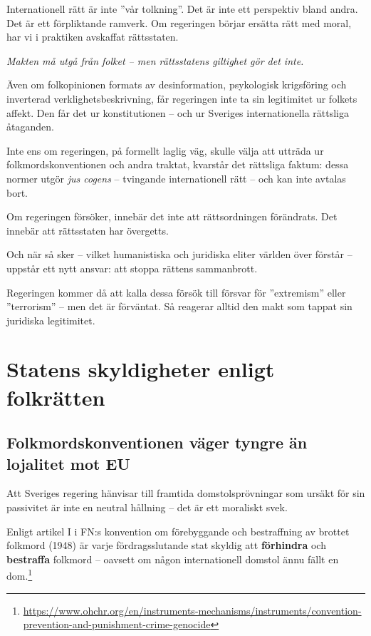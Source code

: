 \documentclass[12pt]{article}
\begin{document}
Internationell rätt är inte ”vår tolkning”. Det är inte ett perspektiv bland andra. Det är ett förpliktande ramverk. Om regeringen börjar ersätta rätt med moral, har vi i praktiken avskaffat rättsstaten.

\vspace{1em}
\textit{Makten må utgå från folket – men rättsstatens giltighet gör det inte.}

Även om folkopinionen formats av desinformation, psykologisk krigsföring och inverterad verklighetsbeskrivning, får regeringen inte ta sin legitimitet ur folkets affekt. Den får det ur konstitutionen – och ur Sveriges internationella rättsliga åtaganden.

Inte ens om regeringen, på formellt laglig väg, skulle välja att utträda ur folkmordskonventionen och andra traktat, kvarstår det rättsliga faktum: dessa normer utgör \textit{jus cogens} – tvingande internationell rätt – och kan inte avtalas bort.

Om regeringen försöker, innebär det inte att rättsordningen förändrats. Det innebär att rättsstaten har övergetts.

Och när så sker – vilket humanistiska och juridiska eliter världen över förstår – uppstår ett nytt ansvar: att stoppa rättens sammanbrott.

\vspace{1em}
Regeringen kommer då att kalla dessa försök till försvar för ”extremism” eller ”terrorism” – men det är förväntat. Så reagerar alltid den makt som tappat sin juridiska legitimitet.






\section*{Statens skyldigheter enligt folkrätten}
\subsection*{Folkmordskonventionen väger tyngre än lojalitet mot EU}

Att Sveriges regering hänvisar till framtida domstolsprövningar som ursäkt för sin passivitet är inte en neutral hållning – det är ett moraliskt svek.

Enligt artikel I i FN:s konvention om förebyggande och bestraffning av brottet folkmord (1948) är varje fördragsslutande stat skyldig att \textbf{förhindra} och \textbf{bestraffa} folkmord – oavsett om någon internationell domstol ännu fällt en dom.\footnote{\url{https://www.ohchr.org/en/instruments-mechanisms/instruments/convention-prevention-and-punishment-crime-genocide}}
\end{document}
